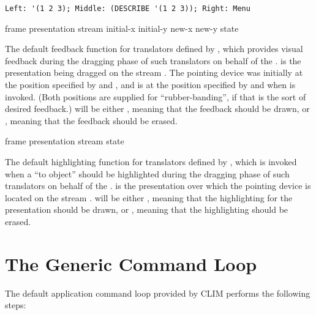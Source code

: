\begin{verbatim}
Left: '(1 2 3); Middle: (DESCRIBE '(1 2 3)); Right: Menu
\end{verbatim}


 {frame presentation stream
                                            initial-x initial-y new-x new-y state} 

The default feedback function for translators defined by
, which provides visual feedback during the
dragging phase of such translators on behalf of the  .
 is the presentation being dragged on the stream .
The pointing device was initially at the position specified by 
and , and is at the position specified by  and
 when  is invoked.  (Both positions
are supplied for ``rubber-banding'', if that is the sort of desired feedback.)
 will be either , meaning that the feedback should be
drawn, or , meaning that the feedback should be erased.

 {frame presentation stream state}

The default highlighting function for translators defined by
, which is invoked when a ``to object''
should be highlighted during the dragging phase of such translators on behalf of
the  .   is the presentation over which
the pointing device is located on the stream .   will be
either , meaning that the highlighting for the presentation
should be drawn, or , meaning that the highlighting should be
erased.


\section {The Generic Command Loop}

The default application command loop provided by CLIM performs the following
steps:


